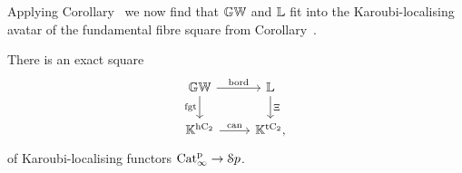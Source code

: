 Applying Corollary~ we now find that $\mathbb{GW}$ and $\mathbb{L}$ fit into the Karoubi-localising avatar of the fundamental fibre square from Corollary~.
\begin{corollary}
\label{corollary:Karoubi-fund-square}%
There is an exact square 
\begin{equation}
\label{equation:fundamental-karoubi}%
 \begin{tikzcd}
  \KGW \ar[r,"\bord"] \ar[d,"\fgt"'] & \KL \ar[d,"\Xi"] \\
  \KK^{\hC} \ar[r,"\mathrm{can}"] & \KK^{\tC},
 \end{tikzcd}
\end{equation}
of Karoubi-localising functors $\mathrm{Cat}^{\mathrm p}_\infty \rightarrow {\mathcal Sp}$. 
\end{corollary}



